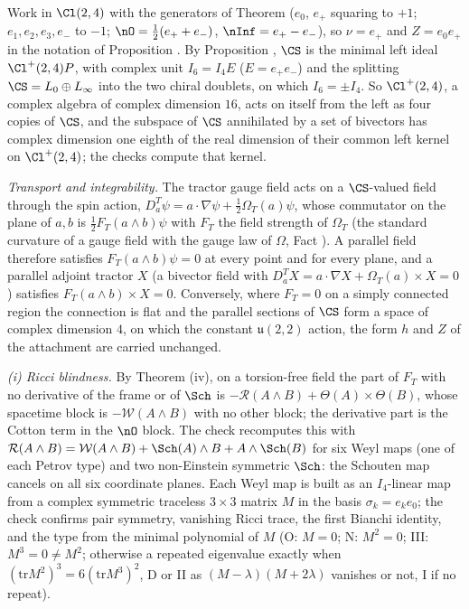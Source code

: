 Work in $\Cl(2,4)$ with the generators of Theorem  ($e_{0}$, $e_{+}$ squaring to $+1$; $e_{1}, e_{2}, e_{3}, e_{-}$ to $-1$; $\nO = \tfrac12(e_{+} + e_{-})$, $\nInf = e_{+} - e_{-}$), so $\nu = e_{+}$ and $Z = e_{0}e_{+}$ in the notation of Proposition . By Proposition , $\CS$ is the minimal left ideal $\Cl^{+}(2,4)P$, with complex unit $I_{6} = I_{4}E$ ($E = e_{+}e_{-}$) and the splitting $\CS = L_{0} \oplus L_{\infty}$ into the two chiral doublets, on which $I_{6} = \pm I_{4}$. So $\Cl^{+}(2,4)$, a complex algebra of complex dimension $16$, acts on itself from the left as four copies of $\CS$, and the subspace of $\CS$ annihilated by a set of bivectors has complex dimension one eighth of the real dimension of their common left kernel on $\Cl^{+}(2,4)$; the checks compute that kernel.

\emph{Transport and integrability.} The tractor gauge field acts on a $\CS$-valued field through the spin action, $D^{T}_{a}\psi = a\cdot\nabla\psi + \tfrac12\Omega_{T}(a)\psi$, whose commutator on the plane of $a, b$ is $\tfrac12 F_{T}(a\wedge b)\psi$ with $F_{T}$ the field strength of $\Omega_{T}$ (the standard curvature of a gauge field with the gauge law of $\Omega$, Fact ). A parallel field therefore satisfies $F_{T}(a\wedge b)\psi = 0$ at every point and for every plane, and a parallel adjoint tractor $X$ (a bivector field with $D^{T}_{a}X = a\cdot\nabla X + \Omega_{T}(a)\times X = 0$) satisfies $F_{T}(a\wedge b)\times X = 0$. Conversely, where $F_{T} = 0$ on a simply connected region the connection is flat and the parallel sections of $\CS$ form a space of complex dimension $4$, on which the constant $\mathfrak{u}(2,2)$ action, the form $h$ and $Z$ of the attachment are carried unchanged.

\emph{(i) Ricci blindness.} By Theorem (iv), on a torsion-free field the part of $F_{T}$ with no derivative of the frame or of $\Sch$ is $-\mathcal{R}(A\wedge B) + \Theta(A)\times\Theta(B)$, whose spacetime block is $-\mathcal{W}(A\wedge B)$ with no other block; the derivative part is the Cotton term in the $\nO$ block. The check recomputes this with $\mathcal{R}(A\wedge B) = \mathcal{W}(A\wedge B) + \Sch(A)\wedge B + A\wedge\Sch(B)$ for six Weyl maps (one of each Petrov type) and two non-Einstein symmetric $\Sch$: the Schouten map cancels on all six coordinate planes. Each Weyl map is built as an $I_{4}$-linear map from a complex symmetric traceless $3\times3$ matrix $M$ in the basis $\sigma_{k} = e_{k}e_{0}$; the check confirms pair symmetry, vanishing Ricci trace, the first Bianchi identity, and the type from the minimal polynomial of $M$ (O: $M = 0$; N: $M^{2} = 0$; III: $M^{3} = 0 \neq M^{2}$; otherwise a repeated eigenvalue exactly when $(\mathrm{tr}M^{2})^{3} = 6(\mathrm{tr}M^{3})^{2}$, D or II as $(M - \lambda)(M + 2\lambda)$ vanishes or not, I if no repeat).

